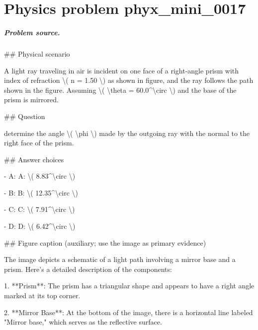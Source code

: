 
\chapter{Physics problem phyx\_mini\_0017}
\label{ch:PhyXMiniProblems_problem_phyx_mini_0017}

\paragraph{Problem source.}
\#\# Physical scenario

A light ray traveling in air is incident on one face of a right-angle prism with index of refraction \textbackslash{}( n = 1.50 \textbackslash{}) as shown in figure, and the ray follows the path shown in the figure. Assuming \textbackslash{}( \textbackslash{}theta = 60.0\textasciicircum{}\textbackslash{}circ \textbackslash{}) and the base of the prism is mirrored.

\#\# Question

determine the angle \textbackslash{}( \textbackslash{}phi \textbackslash{}) made by the outgoing ray with the normal to the right face of the prism.

\#\# Answer choices

- A: A: \textbackslash{}( 8.83\textasciicircum{}\textbackslash{}circ \textbackslash{})

- B: B: \textbackslash{}( 12.35\textasciicircum{}\textbackslash{}circ \textbackslash{})

- C: C: \textbackslash{}( 7.91\textasciicircum{}\textbackslash{}circ \textbackslash{})

- D: D: \textbackslash{}( 6.42\textasciicircum{}\textbackslash{}circ \textbackslash{})

\#\# Figure caption (auxiliary; use the image as primary evidence)

The image depicts a schematic of a light path involving a mirror base and a prism. Here's a detailed description of the components:

1. **Prism**: The prism has a triangular shape and appears to have a right angle marked at its top corner.

2. **Mirror Base**: At the bottom of the image, there is a horizontal line labeled "Mirror base," which serves as the reflective surface.


